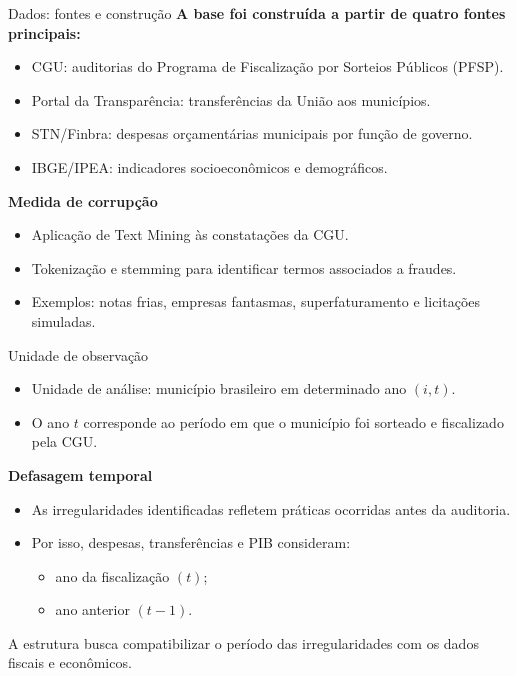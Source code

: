 \documentclass[
  10pt,
  ignorenonframetext,
  aspectratio=169,
  brazilian,
]{beamer}
\providecommand{\tightlist}{%
  \setlength{\itemsep}{0pt}\setlength{\parskip}{0pt}}
\begin{document}
\begin{frame}{Dados: fontes e construção}
\protect{}\label{dados-fontes-e-construuxe7uxe3o}
\textbf{A base foi construída a partir de quatro fontes principais:}

\begin{itemize}
\tightlist
\item
  CGU: auditorias do Programa de Fiscalização por Sorteios Públicos
  (PFSP).
\item
  Portal da Transparência: transferências da União aos municípios.
\item
  STN/Finbra: despesas orçamentárias municipais por função de governo.
\item
  IBGE/IPEA: indicadores socioeconômicos e demográficos.
\end{itemize}

\textbf{Medida de corrupção}

\begin{itemize}
\tightlist
\item
  Aplicação de Text Mining às constatações da CGU.
\item
  Tokenização e stemming para identificar termos associados a fraudes.
\item
  Exemplos: notas frias, empresas fantasmas, superfaturamento e
  licitações simuladas.
\end{itemize}
\end{frame}

\begin{frame}{Unidade de observação}
\protect{}\label{unidade-de-observauxe7uxe3o}
\begin{itemize}
\tightlist
\item
  Unidade de análise: município brasileiro em determinado ano \((i,t)\).
\item
  O ano \(t\) corresponde ao período em que o município foi sorteado e
  fiscalizado pela CGU.
\end{itemize}

\textbf{Defasagem temporal}

\begin{itemize}
\tightlist
\item
  As irregularidades identificadas refletem práticas ocorridas antes da
  auditoria.
\item
  Por isso, despesas, transferências e PIB consideram:

  \begin{itemize}
  \tightlist
  \item
    ano da fiscalização \((t)\);
  \item
    ano anterior \((t-1)\).
  \end{itemize}
\end{itemize}

A estrutura busca compatibilizar o período das irregularidades com os
dados fiscais e econômicos.
\end{frame}
\end{document}
